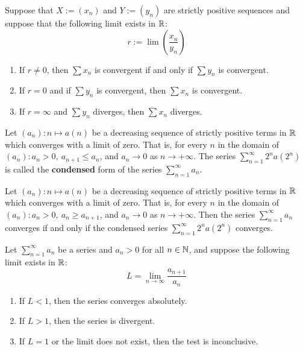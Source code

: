 \begin{theorem}
	Suppose that $X:=(x_n)$ and $Y:=(y_n)$ are strictly positive sequences and suppose that the following limit exists in $\mathbb{R}$:
	\[r:=\lim \left(\frac{x_n}{y_n}\right)\]
	\begin{enumerate}
		\item If $r \neq 0$, then $\sum x_n$ is convergent if and only if $\sum y_n$ is convergent.
		\item If $r=0$ and if $\sum y_n$ is convergent, then $\sum x_n$ is convergent.
		\item If $r=\infty$ and $\sum y_n$ diverges, then $\sum x_n$ diverges.
	\end{enumerate}
\end{theorem}

\begin{definition}
	Let $(a_n):n \mapsto a(n)$ be a decreasing sequence of strictly positive terms in $\mathbb{R}$ which converges with a limit of zero. That is, for every $n$ in the domain of $(a_n):a_n>0,\ a_{n+1} \leq a_n$, and $a_n \to 0$ as $n \to + \infty$. The series $\displaystyle\sum_{n=1}^{\infty} 2^n a(2^n)$ is called the \textbf{condensed} form of the series $\displaystyle\sum_{n=1}^{\infty} a_n$.
\end{definition}

\begin{theorem}
	Let $(a_n):n \mapsto a(n)$ be a decreasing sequence of strictly positive terms in $\mathbb{R}$ which converges with a limit of zero. That is, for every $n$ in the domain of $(a_n):a_n>0,\ a_n \geq a_{n+1}$, and $a_n \to 0$ as $n \to +\infty$. Then the series $\displaystyle\sum_{n=1}^{\infty} a_n$ converges if and only if the condensed series $\displaystyle\sum_{n=1}^{\infty} 2^na(2^n)$ converges.
\end{theorem}

\begin{theorem}
	Let $\displaystyle\sum_{n=1}^{\infty} a_n$ be a series and $a_n>0$ for all $n \in \mathbb{N}$, and suppose the following limit exists in $\mathbb{R}$:
	\[L=\lim\limits_{n \to \infty} \frac{a_{n+1}}{a_n}\]
	\begin{enumerate}
		\item If $L<1$, then the series converges absolutely.
		\item If $L>1$, then the series is divergent.
		\item If $L=1$ or the limit does not exist, then the test is inconclusive.
	\end{enumerate}
\end{theorem}

